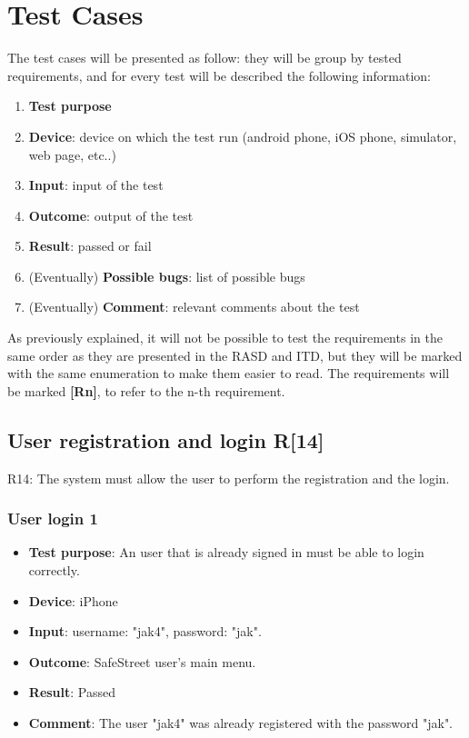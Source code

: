 \documentclass[../ATD.tex]{subfiles}
\begin{document}
    \section{Test Cases}\label{sec:test-cases}
    The test cases will be presented as follow: they will be group by tested requirements, and for every test will be described the following information:
    \begin{enumerate}
        \item \textbf{Test purpose}
        \item \textbf{Device}: device on which the test run (android phone, iOS phone, simulator, web page, etc..)
        \item \textbf{Input}: input of the test
        \item \textbf{Outcome}: output of the test
        \item \textbf{Result}: passed or fail
        \item (Eventually) \textbf{Possible bugs}: list of possible bugs
        \item (Eventually) \textbf{Comment}: relevant comments about the test
    \end{enumerate}
    As previously explained, it will not be possible to test the requirements in the same order as they are presented in the RASD and ITD,
    but they will be marked with the same enumeration to make them easier to read.
    The requirements will be marked \textbf{[Rn]}, to refer to the n-th requirement.

    \subsection{User registration and login R[14]}\label{subsec:user-registration-and-login}
    R14: The system must allow the user to perform the registration and the login.

    \subsubsection{User login 1}\label{subsubsec:user-login-1}
    \begin{itemize}
        \item \textbf{Test purpose}: An user that is already signed in must be able to login correctly.
        \item \textbf{Device}: iPhone
        \item \textbf{Input}: username: "jak4", password: "jak".
        \item \textbf{Outcome}: SafeStreet user's main menu.
        \item \textbf{Result}: Passed
        \item \textbf{Comment}: The user "jak4" was already registered with the password "jak".
    \end{itemize}
\end{document}
